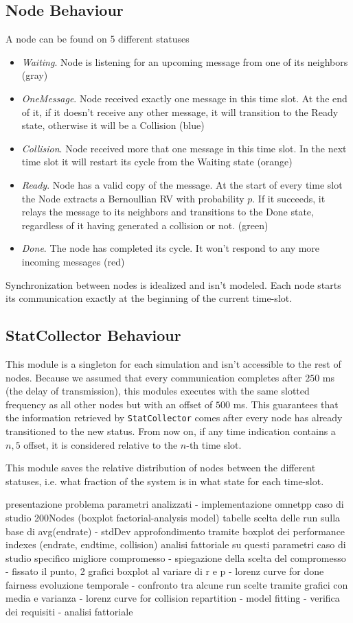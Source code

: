 \subsection{Node Behaviour}
A node can be found on 5 different statuses
\begin{itemize}
\item \textit{Waiting}. Node is listening for an upcoming message from one of its neighbors (gray)
\item \textit{OneMessage}. Node received exactly one message in this time slot. At the end of it, if it doesn't receive any other message, it will transition to the Ready state, otherwise it will be a Collision (blue)
\item \textit{Collision}. Node received more that one message in this time slot. In the next time slot it will restart its cycle from the Waiting state (orange)
\item \textit{Ready}. Node has a valid copy of the message. At the start of every time slot the Node extracts a Bernoullian RV with probability $p$. If it succeeds, it relays the message to its neighbors and transitions to the Done state, regardless of it having generated a collision or not. (green)
\item \textit{Done}. The node has completed its cycle. It won't respond to any more incoming messages (red)
\end{itemize}
Synchronization between nodes is idealized and isn't modeled. Each node starts its communication exactly at the beginning of the current time-slot.
\subsection{StatCollector Behaviour}
This module is a singleton for each simulation and isn't accessible to the rest of nodes. Because we assumed that every communication completes after $250$ ms (the delay of transmission), this modules executes with the same slotted frequency as all other nodes but with an offset of $500$ ms. This guarantees that the information retrieved by \texttt{StatCollector} comes after every node has already transitioned to the new status. From now on, if any time indication contains a $n,5$ offset, it is considered relative to the $n$-th time slot.

This module saves the relative distribution of nodes between the different statuses, i.e. what fraction of the system is in what state for each time-slot. %

\iffalse
presentazione problema
parametri analizzati
    - implementazione omnetpp
caso di studio 200Nodes (boxplot factorial-analysis model)
	tabelle scelta delle run sulla base di avg(endrate) - stdDev
approfondimento tramite boxplot dei performance indexes (endrate, endtime, collision)
analisi fattoriale su questi parametri
caso di studio specifico migliore compromesso
- spiegazione della scelta del compromesso
- fissato il punto, 2 grafici boxplot al variare di r e p
- lorenz curve for done fairness
evoluzione temporale 
- confronto tra alcune run scelte tramite grafici con media e varianza
- lorenz curve for collision repartition
- model fitting
    - verifica dei requisiti
    - analisi fattoriale
    
